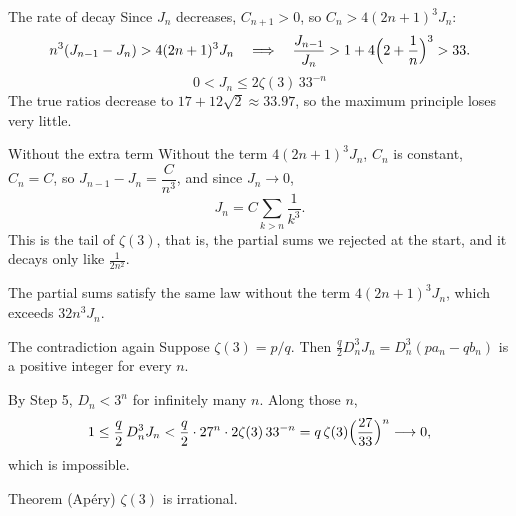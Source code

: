\documentclass[aspectratio=169,11pt]{beamer}
\newcommand{\Dn}{D_n}
\begin{document}
\begin{frame}{The rate of decay}
  Since $J_n$ decreases, $C_{n+1}>0$, so $C_n>4(2n+1)^3J_n$:
  \[
    n^3(J_{n-1}-J_n)>4(2n+1)^3J_n\quad\Longrightarrow\quad
    \frac{J_{n-1}}{J_n}>1+4\Bigl(2+\frac1n\Bigr)^3>33 .
  \]
  \[
    \boxed{\;0<J_n\le2\zeta(3)\,33^{-n}\;}
  \]
  \pause
  The true ratios decrease to $17+12\sqrt2\approx33.97$, so the maximum principle loses very little.
\end{frame}

\begin{frame}{Without the extra term}
  Without the term $4(2n+1)^3J_n$, $C_n$ is constant, $C_n=C$, so $J_{n-1}-J_n=\dfrac C{n^3}$, and since $J_n\to0$,
  \[
    J_n=C\sum_{k>n}\frac1{k^3}.
  \]
  This is the tail of $\zeta(3)$, that is, the partial sums we rejected at the start, and it
  decays only like $\frac1{2n^2}$.
  \medskip

  The partial sums satisfy the same law without the term $4(2n+1)^3J_n$, which exceeds $32n^3J_n$.
\end{frame}

\begin{frame}{The contradiction again}
  Suppose $\zeta(3)=p/q$. Then $\frac q2\Dn^3J_n=\Dn^3(pa_n-qb_n)$ is a \alert{positive integer}
  for every $n$.
  \pause

  By Step 5, $\Dn<3^n$ for infinitely many $n$. Along those $n$,
  \[
    1\le\frac q2\,\Dn^3J_n<\frac q2\cdot27^n\cdot2\zeta(3)\,33^{-n}
    =q\,\zeta(3)\Bigl(\frac{27}{33}\Bigr)^n\longrightarrow0 ,
  \]
  \pause
  which is impossible.
  \begin{alertblock}{Theorem (Ap\'ery)}
    $\zeta(3)$ is irrational.
  \end{alertblock}
\end{frame}
\end{document}
